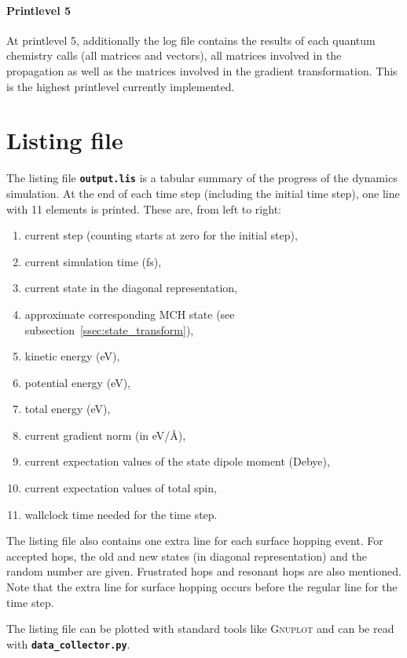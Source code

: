\documentclass[a4paper,10pt,DIV=15,openany]{scrbook}
\newcommand{\ttt}[1]{\textbf{\texttt{#1}}}
\begin{document}
\paragraph{Printlevel 5}

At printlevel 5, additionally the log file contains the results of each quantum chemistry calls (all matrices and vectors), all matrices involved in the propagation as well as the matrices involved in the gradient transformation. This is the highest printlevel currently implemented.

\section{Listing file}\label{sec:lisfile}

The listing file \ttt{output.lis} is a tabular summary of the progress of the dynamics simulation. At the end of each time step (including the initial time step), one line with 11 elements is printed. These are, from left to right:
\begin{enumerate}
  \item current step (counting starts at zero for the initial step),
  \item current simulation time (fs),
  \item current state in the diagonal representation,
  \item approximate corresponding MCH state (see subsection~\ref{ssec:state_transform}),
  \item kinetic energy (eV),
  \item potential energy (eV),
  \item total energy (eV),
  \item current gradient norm (in eV/\AA),
  \item current expectation values of the state dipole moment (Debye),
  \item current expectation values of total spin,
  \item wallclock time needed for the time step.
\end{enumerate}
The listing file also contains one extra line for each surface hopping event. For accepted hops, the old and new states (in diagonal representation) and the random number are given. Frustrated hops and resonant hops are also mentioned. Note that the extra line for surface hopping occurs before the regular line for the time step. 

The listing file can be plotted with standard tools like \textsc{Gnuplot} and can be read with \ttt{data\_collector.py}. 
\end{document}
